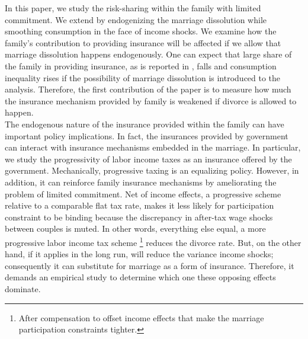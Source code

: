 In this paper, we study the risk-sharing within the family with limited commitment. We extend \citet{Blundell_etal_2015_Con-Ineq} by endogenizing the marriage dissolution while smoothing consumption in the face of income shocks. We examine how the family's contribution to providing insurance will be affected if we allow that marriage dissolution happens endogenously. One can expect that large share of the family in providing insurance, as is reported in \citet{Blundell_etal_2015_Con-Ineq}, falls and consumption inequality rises if the possibility of marriage dissolution is introduced to the analysis. Therefore, the first contribution of the paper is to measure how much the insurance mechanism provided by family is weakened if divorce is allowed to happen. \\ 

The endogenous nature of the insurance provided within the family can have important policy implications. In fact, the insurances provided by government can interact with insurance mechanisms embedded in the marriage. In particular, we study the progressivity of labor income taxes as an insurance offered by the government. Mechanically, progressive taxing is an equalizing policy. However, in addition, it can reinforce family insurance mechanisms by ameliorating the problem of limited commitment. Net of income effects, a progressive scheme relative to a comparable flat tax rate, makes it less likely for participation constraint to be binding because the discrepancy in after-tax wage shocks between couples is muted. In other words, everything else equal, a more progressive labor income tax scheme \footnote{After compensation to offset income effects that make the marriage participation constraints tighter.} reduces the divorce rate. But, on the other hand, if it applies in the long run, will reduce the variance income shocks; consequently it can substitute for marriage as a form of insurance. Therefore, it demands an empirical study to determine which one these opposing effects dominate.  \\

